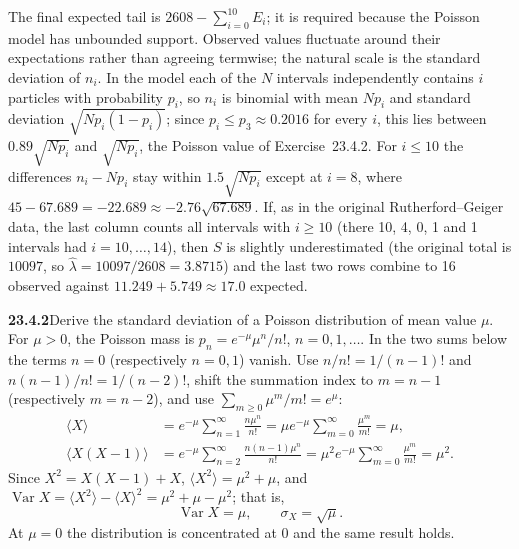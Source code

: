 The final expected tail is $2608-\sum_{i=0}^{10}E_i$; it is required
because the Poisson model has unbounded support. Observed values
fluctuate around their expectations rather than agreeing termwise; the
natural scale is the standard deviation of $n_i$. In the model each of
the $N$ intervals independently contains $i$ particles with probability
$p_i$, so $n_i$ is binomial with mean $Np_i$ and standard deviation
$\sqrt{Np_i(1-p_i)}$; since $p_i\le p_3\approx0.2016$ for every $i$,
this lies between $0.89\sqrt{Np_i}$ and $\sqrt{Np_i}$, the Poisson
value of Exercise~23.4.2. For $i\le10$ the
differences $n_i-Np_i$ stay within $1.5\sqrt{Np_i}$ except at $i=8$,
where $45-67.689=-22.689\approx-2.76\sqrt{67.689}$. If, as in the
original Rutherford--Geiger data, the last column counts all intervals
with $i\ge10$ (there 10, 4, 0, 1 and 1 intervals had
$i=10,\ldots,14$), then $S$ is slightly underestimated (the original
total is $10097$, so $\widehat\lambda=10097/2608=3.8715$) and the last
two rows combine to 16 observed against $11.249+5.749\approx17.0$
expected.


\par\bigskip
\noindent\textbf{23.4.2}\quad Derive the standard deviation of a
Poisson distribution of mean value $\mu$.
\solution
For $\mu>0$, the Poisson mass is $p_n=e^{-\mu}\mu^n/n!$,
$n=0,1,\ldots$. In the two sums below the terms $n=0$ (respectively
$n=0,1$) vanish. Use $n/n!=1/(n-1)!$ and $n(n-1)/n!=1/(n-2)!$, shift
the summation index to $m=n-1$ (respectively $m=n-2$), and use
$\sum_{m\ge0}\mu^m/m!=e^{\mu}$:
\begin{align*}
\langle X\rangle&=e^{-\mu}\sum_{n=1}^{\infty}
\frac{n\mu^n}{n!}
=\mu e^{-\mu}\sum_{m=0}^{\infty}\frac{\mu^m}{m!}=\mu,\\
\langle X(X-1)\rangle&=e^{-\mu}\sum_{n=2}^{\infty}
\frac{n(n-1)\mu^n}{n!}
=\mu^2e^{-\mu}\sum_{m=0}^{\infty}\frac{\mu^m}{m!}=\mu^2.
\end{align*}
Since $X^2=X(X-1)+X$, $\langle X^2\rangle=\mu^2+\mu$, and
$\operatorname{Var}X=\langle X^2\rangle-\langle X\rangle^2
=\mu^2+\mu-\mu^2$; that is,
\[
\boxed{\operatorname{Var}X=\mu,\qquad\sigma_X=\sqrt\mu}.
\]
At $\mu=0$ the distribution is concentrated at 0 and the same result holds.


